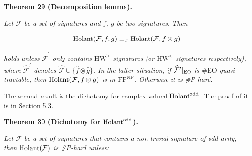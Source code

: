 \documentclass[10pt,a4paper]{article}
\begin{document}


\par\medskip\noindent\textbf{
\textbf{Theorem 29}\textbf{ }(Decomposition lemma)\textbf{.}
}\par



\emph{Let $\mathcal{F}$ be a set of signatures and $f$, $g$ be two signatures. Then}\par


\[\begin{gathered}
\textup{{Holant}}(\mathcal{F},f,g)\equiv_{T}\textup{{Holant}}(\mathcal{F},f\otimes g)
\end{gathered}\]


\emph{holds unless $\widehat{\mathcal{F}}^{\prime}$ only contains $\text{HW}^{\geq}$ signatures (or $\text{HW}^{\leq}$ signatures respectively), where $\widehat{\mathcal{F}}^{\prime}$ denotes $\widehat{\mathcal{F}}\cup\{\widehat{f}\otimes\widehat{g}\}$.
In the latter situation, if $\widehat{\mathcal{F}}^{\prime}|_{\textup{{EO}}}$ is }\#EO\emph{-quasi-tractable, then $\textup{{Holant}}(\mathcal{F},f\otimes g)$ is in $\text{FP}^{\text{NP}}$. Otherwise it is \#P-hard.}\par






The second result is the dichotomy for complex-valued $\textup{{Holant}}^{\text{odd}}$. The proof of it is in Section 5.3.\par






\par\medskip\noindent\textbf{
\textbf{Theorem 30}\textbf{ }(Dichotomy for $\textup{{Holant}}^{\text{odd}}$)\textbf{.}
}\par



\emph{Let $\mathcal{F}$ be a set of signatures that contains a non-trivial signature of odd arity, then $\textup{{Holant}}(\mathcal{F})$ is \#P-hard unless:}\par
\end{document}
